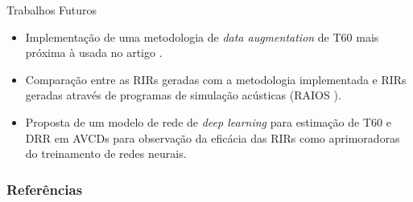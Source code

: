 \documentclass{libs/XJTLU_format}
\begin{document}
\begin{frame} {Trabalhos Futuros}
    \begin{itemize}
        \justifying
        \item Implementação de uma metodologia de \textit{data augmentation} de T60 mais próxima à usada no artigo \cite{RIR_Data_Aug}.
        \item Comparação entre as RIRs geradas com a metodologia implementada e RIRs geradas através de programas de simulação acústicas (RAIOS \cite{RAIOS}).
        \item Proposta de um modelo de rede de \textit{deep learning} para estimação de T60 e DRR em AVCDs para observação da eficácia das RIRs 
        como aprimoradoras do treinamento de redes neurais.
    \end{itemize}
\end{frame}

\begin{frame}
    \centering
    \huge{\textbf{}}    
\end{frame}

\begin{frame}%
    \frametitle{Referências}
    \printbibliography
\end{frame}
\end{document}
